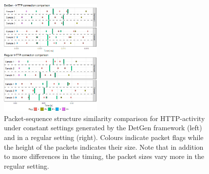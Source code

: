 \documentclass[sigconf]{acmart}
\begin{document}



\begin{figure}
\centering
\includegraphics[width=0.45\textwidth]{images/HTTP_comp_crop.png}
\caption{Packet-sequence structure similarity comparison for HTTP-activity under constant settings generated by the DetGen framework (left) and in a regular setting (right). Colours indicate packet flags while the height of the packets indicates their size. Note that in addition to more differences in the timing, the packet sizes vary more in the regular setting. }
\end{figure}








\end{document}
